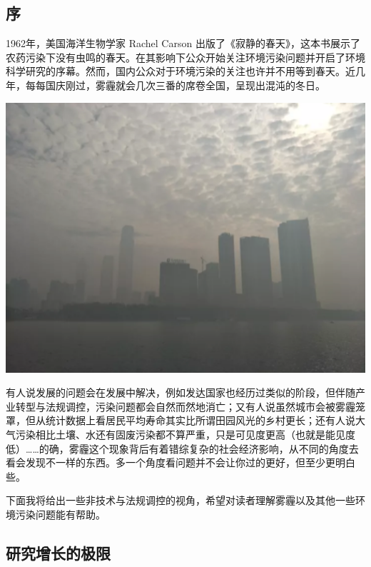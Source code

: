 \documentclass[
]{book}
\begin{document}
\hypertarget{ux5e8f}{%
\subsection{序}\label{ux5e8f}}

1962年，美国海洋生物学家 Rachel Carson 出版了《寂静的春天》，这本书展示了农药污染下没有虫鸣的春天。在其影响下公众开始关注环境污染问题并开启了环境科学研究的序幕。然而，国内公众对于环境污染的关注也许并不用等到春天。近几年，每每国庆刚过，雾霾就会几次三番的席卷全国，呈现出混沌的冬日。

\includegraphics[width=6.67in]{images/cw1}

有人说发展的问题会在发展中解决，例如发达国家也经历过类似的阶段，但伴随产业转型与法规调控，污染问题都会自然而然地消亡；又有人说虽然城市会被雾霾笼罩，但从统计数据上看居民平均寿命其实比所谓田园风光的乡村更长；还有人说大气污染相比土壤、水还有固废污染都不算严重，只是可见度更高（也就是能见度低）\ldots\ldots 的确，雾霾这个现象背后有着错综复杂的社会经济影响，从不同的角度去看会发现不一样的东西。多一个角度看问题并不会让你过的更好，但至少更明白些。

下面我将给出一些非技术与法规调控的视角，希望对读者理解雾霾以及其他一些环境污染问题能有帮助。

\hypertarget{ux7814ux7a76ux589eux957fux7684ux6781ux9650}{%
\subsection{研究增长的极限}\label{ux7814ux7a76ux589eux957fux7684ux6781ux9650}}
\end{document}
